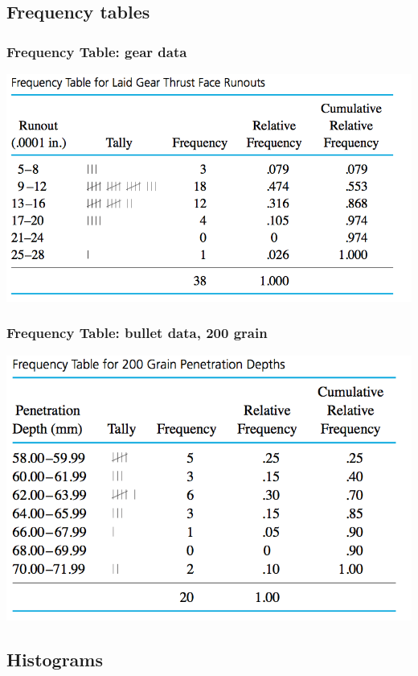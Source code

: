 \documentclass[handout]{beamer}\usepackage{graphicx, color}
\numberwithin{equation}{section}
\begin{document}
\subsection{Frequency tables}

\begin{frame}
\frametitle{Frequency Table: gear data}
\begin{center}
 \includegraphics{../../fig/gearfreq.png}
\end{center}
\end{frame}

\begin{frame}
\frametitle{Frequency Table: bullet data, 200 grain}
\begin{center}
 \includegraphics{../../fig/bulletsfreq.png}
\end{center}
\end{frame}

\subsection{Histograms}
\end{document}
